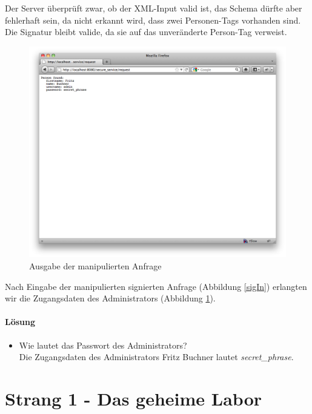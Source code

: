 \documentclass[12pt]{article}
\begin{document}
Der Server überprüft zwar, ob der XML-Input valid ist, das Schema dürfte aber fehlerhaft sein, da nicht erkannt wird, dass zwei Personen-Tags vorhanden sind. Die Signatur bleibt valide, da sie auf das unveränderte Person-Tag verweist. 
 \begin{figure}
  \begin{center}
    \includegraphics[scale=0.25]{images/sigOut.png}
  \end{center}
  \caption{Ausgabe der manipulierten Anfrage}
  \label{sigOut}
\end{figure}
Nach Eingabe der manipulierten signierten Anfrage (Abbildung \ref{sigIn}) erlangten wir die Zugangsdaten des Administrators (Abbildung \ref{sigOut}).

\paragraph{Lösung}
\begin{itemize}
	\item Wie lautet das Passwort des Administrators? \\
		Die Zugangsdaten des Administrators Fritz Buchner lautet \textit{secret\_phrase}.
\end{itemize}

\newpage
\section{Strang 1 - Das geheime Labor}
\end{document}
